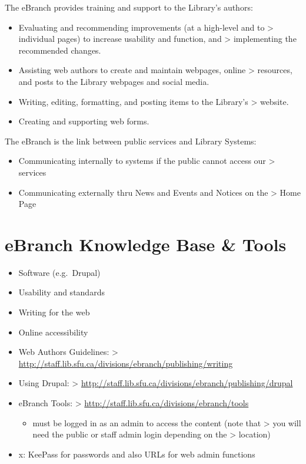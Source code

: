 \documentclass[
  openany]{book}
\providecommand{\tightlist}{%
  \setlength{\itemsep}{0pt}\setlength{\parskip}{0pt}}
\begin{document}
The eBranch provides training and support to the Library's authors:

\begin{itemize}
\item
  Evaluating and recommending improvements (at a high-level and to
  \textgreater{} individual pages) to increase usability and function, and
  \textgreater{} implementing the recommended changes.
\item
  Assisting web authors to create and maintain webpages, online
  \textgreater{} resources, and posts to the Library webpages and social media.
\item
  Writing, editing, formatting, and posting items to the Library's
  \textgreater{} website.
\item
  Creating and supporting web forms.
\end{itemize}

The eBranch is the link between public services and Library Systems:

\begin{itemize}
\item
  Communicating internally to systems if the public cannot access our
  \textgreater{} services
\item
  Communicating externally thru News and Events and Notices on the
  \textgreater{} Home Page
\end{itemize}

\hypertarget{ebranch-knowledge-base-tools}{%
\chapter{eBranch Knowledge Base \& Tools}\label{ebranch-knowledge-base-tools}}

\begin{itemize}
\item
  Software (e.g.~Drupal)
\item
  Usability and standards
\item
  Writing for the web
\item
  Online accessibility
\item
  Web Authors Guidelines:
  \textgreater{} \href{http://staff.lib.sfu.ca/divisions/ebranch/publishing/writing}{{http://staff.lib.sfu.ca/divisions/ebranch/publishing/writing}}
\item
  Using Drupal:
  \textgreater{} \href{http://staff.lib.sfu.ca/divisions/ebranch/publishing/drupal}{{http://staff.lib.sfu.ca/divisions/ebranch/publishing/drupal}}
\item
  eBranch Tools:
  \textgreater{} \href{http://staff.lib.sfu.ca/divisions/ebranch/tools}{{http://staff.lib.sfu.ca/divisions/ebranch/tools}}

  \begin{itemize}
  \tightlist
  \item
    must be logged in as an admin to access the content (note that
    \textgreater{} you will need the public or staff admin login depending on the
    \textgreater{} location)
  \end{itemize}
\item
  x: KeePass for passwords and also URLs for web admin functions
\end{itemize}
\end{document}
